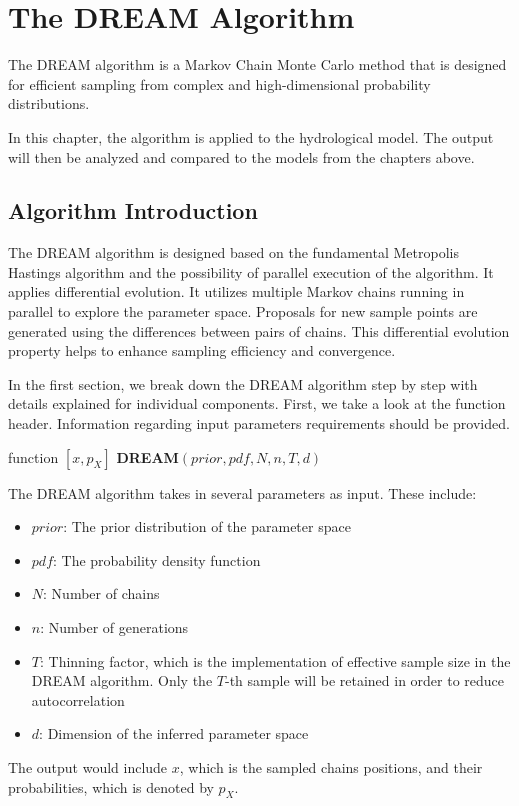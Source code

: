 \chapter{The DREAM Algorithm}
The DREAM algorithm is a Markov Chain Monte Carlo method that is designed for efficient sampling from complex and high-dimensional probability distributions. 

In this chapter, the algorithm is applied to the hydrological model. The output will then be analyzed and compared to the models from the chapters above.

\section{Algorithm Introduction}
The DREAM algorithm is designed based on the fundamental Metropolis Hastings algorithm and the possibility of parallel execution of the algorithm. It applies differential evolution. It utilizes multiple Markov chains running in parallel to explore the parameter space. Proposals for new sample points are generated using the differences between pairs of chains. This differential evolution property helps to enhance sampling efficiency and convergence. 


In the first section, we break down the DREAM algorithm step by step with details explained for individual components.\cite{dream} First, we take a look at the function header. Information regarding input parameters requirements should be provided.

\begin{algorithm}[H]
function $[x, p_X]$ \gets \textbf{DREAM}$(prior, pdf, N, n, T, d)$
\end{algorithm}

The DREAM algorithm takes in several parameters as input. These include:
\begin{itemize}
    \item $prior$: The prior distribution of the parameter space
    \item $pdf$: The probability density function
    \item $N$: Number of chains
    \item $n$: Number of generations
    \item $T$: Thinning factor, which is the implementation of effective sample size in the DREAM algorithm. Only the $T$-th sample will be retained in order to reduce autocorrelation\cite{dream}
    \item $d$: Dimension of the inferred parameter space
\end{itemize}
The output would include $x$, which is the sampled chains positions, and their probabilities, which is denoted by $p_X$.

